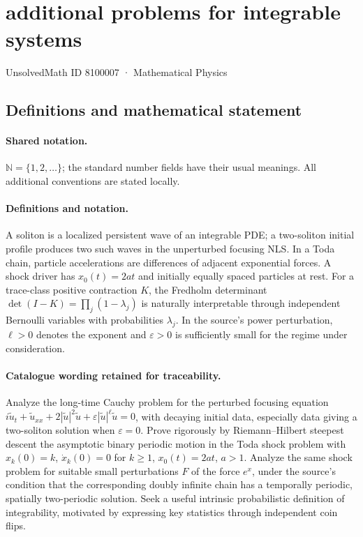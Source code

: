 \documentclass[11pt]{article}
\begin{document}
\setcounter{section}{8100006}
\section{additional problems for integrable systems}\label{8100007}
{\small UnsolvedMath ID 8100007 · Mathematical Physics}
\subsection{Definitions and mathematical statement}

\paragraph{Shared notation.}$\mathbb N=\{1,2,\ldots\}$; the standard number fields have their usual meanings. All additional conventions are stated locally.


\paragraph{Definitions and notation.}A soliton is a localized persistent wave of an integrable PDE; a two-soliton initial profile produces two such waves in the unperturbed focusing NLS. In a Toda chain, particle accelerations are differences of adjacent exponential forces. A shock driver has $x_0(t)=2at$ and initially equally spaced particles at rest. For a trace-class positive contraction $K$, the Fredholm determinant $\det(I-K)=\prod_j(1-\lambda_j)$ is naturally interpretable through independent Bernoulli variables with probabilities $\lambda_j$. In the source's power perturbation, $\ell>0$ denotes the exponent and $\varepsilon>0$ is sufficiently small for the regime under consideration.

\paragraph{Catalogue wording retained for traceability.}
Analyze the long-time Cauchy problem for the perturbed focusing equation $i\widetilde u_t+\widetilde u_{xx}+2|\widetilde u|^2\widetilde u+\varepsilon|\widetilde u|^\ell\widetilde u=0$, with decaying initial data, especially data giving a two-soliton solution when $\varepsilon=0$. Prove rigorously by Riemann--Hilbert steepest descent the asymptotic binary periodic motion in the Toda shock problem with $x_k(0)=k$, $\dot x_k(0)=0$ for $k\ge1$, $x_0(t)=2at$, $a>1$. Analyze the same shock problem for suitable small perturbations $F$ of the force $e^x$, under the source’s condition that the corresponding doubly infinite chain has a temporally periodic, spatially two-periodic solution. Seek a useful intrinsic probabilistic definition of integrability, motivated by expressing key statistics through independent coin flips.
\end{document}
